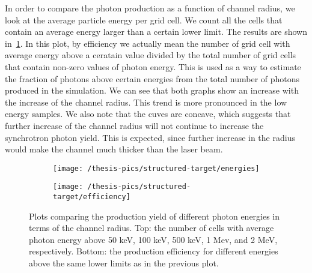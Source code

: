 \documentclass[12pt, class=report, crop=false]{standalone}
\begin{document}
In order to compare the photon production as a function of channel radius, we look at the average particle energy per grid cell. We count all the cells that contain an average energy larger than a certain lower limit. The results are shown in~\cref{fig:efficiency}. In this plot, by efficiency we actually mean the number of grid cell with average energy above a ceratain value divided by the total number of grid cells that contain non-zero values of photon energy. This is used as a way to estimate the fraction of photons above certain energies from the total number of photons produced in the simulation. We can see that both graphs show an increase with the increase of the channel radius. This trend is more pronounced in the low energy samples. We also note that the cuves are concave, which suggests that further increase of the channel radius will not continue to increase the synchrotron photon yield. This is expected, since further increase in the radius would make the channel much thicker than the laser beam.

\begin{figure}[!h]
  \centering
  \begin{subfigure}[t]{0.9\textwidth}
    \centering
    \texttt{[image: /thesis-pics/structured-target/energies]}
  \end{subfigure}
  \hfill
  \begin{subfigure}[t]{0.9\textwidth}
    \centering
    \texttt{[image: /thesis-pics/structured-target/efficiency]}
  \end{subfigure}
  \caption{Plots comparing the production yield of different photon energies in terms of the channel radius. Top: the number of cells with average photon energy above 50 keV, 100 keV, 500 keV, 1 Mev, and 2 MeV, respectively. Bottom: the production efficiency for different energies above the same lower limits as in the previous plot.}%
  \label{fig:efficiency}%
\end{figure}
\end{document}
